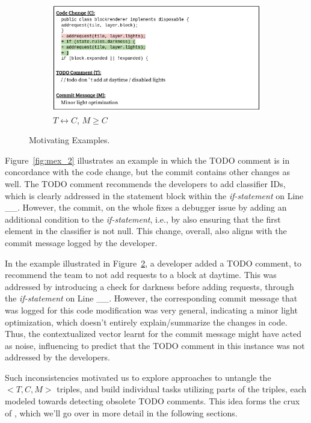 \begin{figure}[t]
\begin{subfigure}{.45\textwidth}
		\includegraphics[width=\textwidth]{images/mex_3.png}
		\caption{$T \leftrightarrow C$, $M \geq C$}
		\label{fig:mex_3}
	\end{subfigure}
\caption{Motivating Examples.}
\end{figure}

Figure~\ref{fig:mex_2} illustrates an example in which the TODO comment is
in concordance with the code change, but the commit contains other 
changes as well. The TODO comment recommends the developers 
to add classifier IDs, which is clearly addressed in the statement 
block within the {\em if-statement} on Line \_\_. However, the commit, on 
the whole fixes a debugger issue by adding an additional condition 
to the {\em if-statement}, i.e., by also ensuring that the first element in 
the classifier is not null. This change, overall, also aligns with the 
commit message logged by the developer.

In the example illustrated in Figure~\ref{fig:mex_3}, a developer added a 
TODO comment, to recommend the team to not add requests to a 
block at daytime. This was addressed by introducing a check for 
darkness before adding requests, through the {\em if-statement} on Line
\_\_. However, the corresponding commit message that was logged
for this code modification was very general, indicating a minor
light optimization, which doesn't entirely explain/summarize the 
changes in code. Thus, the contextualized vector learnt for the 
commit message might have acted as noise, influencing \tdcleaner to
predict that the TODO comment in this instance was not addressed
by the developers. 

Such inconsistencies motivated us to explore approaches to 
untangle the $<T, C, M>$ triples, and build individual tasks utilizing 
parts of the triples, each modeled towards detecting obsolete TODO 
comments. This idea forms the crux of \tool, which we'll 
go over in more detail in the following sections.
